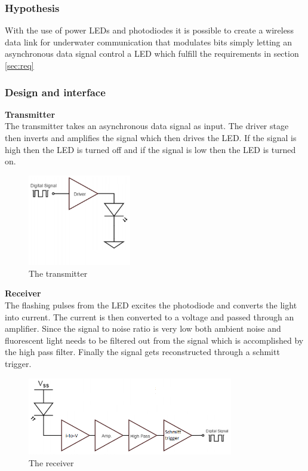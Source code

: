 \subsubsection{Hypothesis}
\label{sec:hypothesis}
With the use of power LEDs and photodiodes it is possible to create a wireless data link for underwater communication that modulates bits simply letting an asynchronous data signal control a LED which fulfill the requirements in section \ref{sec:req}


\subsubsection{Design and interface}
\textbf{Transmitter}\\
The transmitter takes an asynchronous data signal as input. The driver stage then inverts and amplifies the signal which then drives the LED. If the signal is high then the LED is turned off and if the signal is low then the LED is turned on.

\begin{figure}[h]
\centering
\includegraphics[width=0.4\textwidth]{trans}
\caption{The transmitter}
\label{fig:trans}
\end{figure}

 
 \textbf{Receiver}\\
The flashing pulses from the LED excites the photodiode and converts the light into current. The current is then converted to a voltage and passed through an amplifier. Since the signal to noise ratio is very low both ambient noise and fluorescent light needs to be filtered out from the signal which is accomplished by the high pass filter. Finally the signal gets reconstructed through a schmitt trigger.

\begin{figure}[h]
\centering
\includegraphics[width=0.8\textwidth]{rec}
\caption{The receiver}
\label{fig:rec}
\end{figure}


